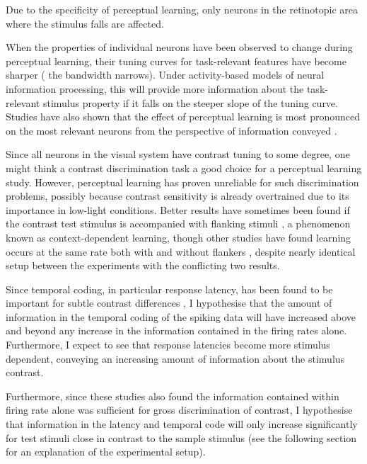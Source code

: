 Due to the specificity of perceptual learning, only neurons in the retinotopic area where the stimulus falls are affected.

When the properties of individual neurons have been observed to change during perceptual learning, their tuning curves for task-relevant features have become sharper (\ie{} the bandwidth narrows).
Under activity-based models of neural information processing, this will provide more information about the task-relevant stimulus property if it falls on the steeper slope of the tuning curve.
Studies have also shown that the effect of perceptual learning is most pronounced on the most relevant neurons from the perspective of information conveyed \citep{Raiguel2006}.



Since all neurons in the visual system have contrast tuning to some degree, one might think a contrast discrimination task a good choice for a perceptual learning study.
However, perceptual learning has proven unreliable for such discrimination problems, possibly because contrast sensitivity is already overtrained due to its importance in low-light conditions.
Better results have sometimes been found if the contrast test stimulus is accompanied with flanking stimuli \citep{Adini2002}, a phenomenon known as context-dependent learning, though other studies have found learning occurs at the same rate both with and without flankers \citep{Yu2004}, despite nearly identical setup between the experiments with the conflicting two results.

Since temporal coding, in particular response latency, has been found to be important for subtle contrast differences \citep{Reich2001,Arabzadeh2006}, I hypothesise that the amount of information in the temporal coding of the spiking data will have increased above and beyond any increase in the information contained in the firing rates alone.
Furthermore, I expect to see that response latencies become more stimulus dependent, conveying an increasing amount of information about the stimulus contrast.

Furthermore, since these studies \citep{Reich2001,Arabzadeh2006} also found the information contained within firing rate alone was sufficient for gross discrimination of contrast, I hypothesise that information in the latency and temporal code will only increase significantly for test stimuli close in contrast to the sample stimulus (see the following section for an explanation of the experimental setup).

